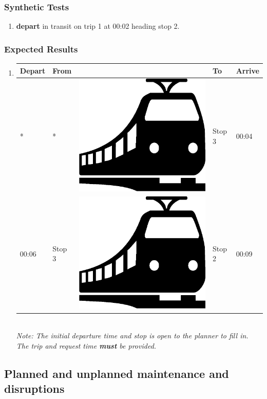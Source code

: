 \documentclass[a4paper,11pt]{article}
\newcommand*{\train}{\includegraphics[scale=0.02]{img/train}}
\begin{document}
\begin{enumerate}
\subsubsection*{Synthetic Tests}
\begin{enumerate}
\item \textbf{depart} in transit on trip 1 at 00:02 heading stop 2.
\end{enumerate}

\subsubsection*{Expected Results}
\begin{enumerate}
\item
{\scriptsize
\begin{tabular}{p{.75cm} | p{3.0cm} c p{3.0cm} | p{.75cm} }
\hline
\rowcolor{Gray}
Depart & From & \hspace{0.4cm} & To & Arrive \\
\hline
* & * & \train & Stop 3 & 00:04 \\
\hline
00:06 & Stop 3 & \train & Stop 2 & 00:09 \\
\hline
\end{tabular}
\\
\tiny{\textit{Note: The initial departure time and stop is open to the planner to fill in. The trip and request time \textbf{must} be provided.}}
}
\end{enumerate}


\end{enumerate}
\newpage


\subsection{Planned and unplanned maintenance and disruptions}
\end{document}
